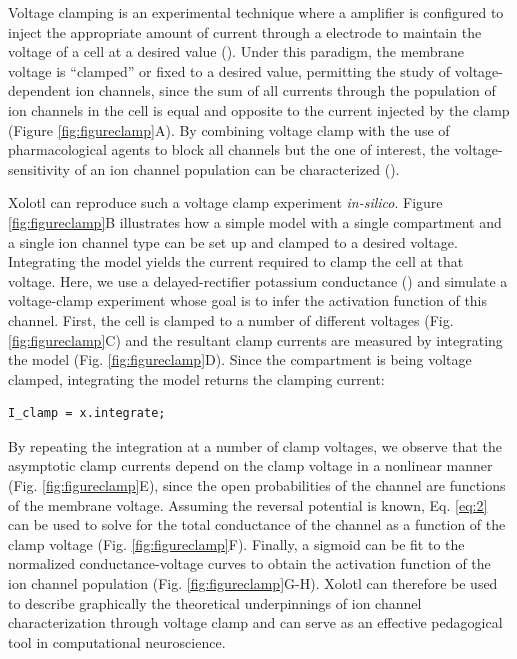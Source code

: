 \documentclass{frontiersSCNS} %
\begin{document}
Voltage clamping is an experimental technique where a amplifier is configured to inject the appropriate amount of current through a electrode to maintain the voltage of a cell at a desired value (\cite{dayanTheoreticalNeuroscience2001}). Under this paradigm, the membrane voltage is ``clamped'' or fixed to a desired value, permitting the study of voltage-dependent ion channels, since the sum of all currents through the population of ion channels in the cell is equal and opposite to the current injected by the clamp (Figure \ref{fig:figureclamp}A). By combining voltage clamp with the use of pharmacological agents to block all channels but the one of interest, the voltage-sensitivity of an ion channel population can be characterized (\cite{coleIonicCurrentMeasurements1960, coleIonsPotentialsNerve1955, hodgkinEffectSodiumIons1949, hodgkinMeasurementCurrentvoltageRelations1952, hodgkinQuantitativeDescriptionMembrane1952, turrigianoSelectiveRegulationCurrent1995}).

Xolotl can reproduce such a voltage clamp experiment \textit{in-silico}. Figure \ref{fig:figureclamp}B illustrates how a simple model with a single compartment and a single ion channel type can be set up and clamped to a desired voltage.  Integrating the model yields the current required to clamp the cell at that voltage. Here, we use a delayed-rectifier potassium conductance (\cite{liuModelNeuronActivityDependent1998}) and simulate a voltage-clamp experiment whose goal is to infer the activation function of this channel. First, the cell is clamped to a number of different voltages (Fig. \ref{fig:figureclamp}C) and the resultant clamp currents are measured by integrating the model (Fig. \ref{fig:figureclamp}D). Since the compartment is being voltage clamped, integrating the model returns the clamping current:

\begin{lstlisting}[style=Matlab-editor]
I_clamp = x.integrate;
\end{lstlisting}


By repeating the integration at a number of clamp voltages, we observe that the asymptotic clamp currents depend on the clamp voltage in a nonlinear manner (Fig. \ref{fig:figureclamp}E), since the open probabilities of the channel are functions of the membrane voltage. Assuming the reversal potential is known, Eq. \eqref{eq:2} can be used to solve for the total conductance of the channel as a function of the clamp voltage (Fig. \ref{fig:figureclamp}F). Finally, a sigmoid can be fit to the normalized conductance-voltage curves to obtain the activation function of the ion channel population (Fig. \ref{fig:figureclamp}G-H). Xolotl can therefore be used to describe graphically the theoretical underpinnings of ion channel characterization through voltage clamp and can serve as an effective pedagogical tool in computational neuroscience.
\end{document}
